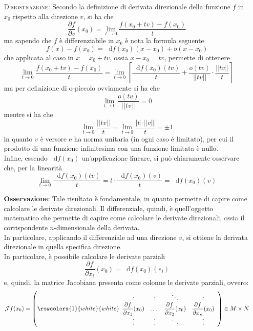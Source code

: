 \documentclass[a4paper]{extarticle}
\newcommand*\dif{\mathop{}\!\mathrm{d}}
\begin{document}
\vspace{2em}
\noindent
\normalfont \normalsize
\textsc{Dimostrazione}: Secondo la definizione di derivata direzionale della funzione $f$ in $x_0$ rispetto alla direzione $v$, si ha che
\[\frac{\partial f}{\partial v}(x_0)= \lim_{t \to 0} \frac{f(x_0+tv) - f(x_0)}{t}\]
ma sapendo che $f$ è differenziabile in $x_0$ è nota la formula seguente
\[f(x)-f(x_0) = \dif f(x_0)(x-x_0)+o(x-x_0)\]
che applicata al caso in $x=x_0+tv$, ossia $x-x_0=tv$, permette di ottenere
\[\lim_{t \to 0} \frac{f(x_0+tv) - f(x_0)}{t} = \lim_{t \to 0} \left[ \frac{\dif f(x_0) (tv)}{t} + \frac{o(t v)}{\vert \vert tv \vert \vert} \cdot \frac{\vert \vert tv \vert \vert}{t}\right]\]
ma per definizione di o-piccolo ovviamente si ha che
\[\lim_{t \to 0} \frac{o(t v)}{\vert \vert tv \vert \vert} = 0\]
mentre si ha che
\[\lim_{t \to 0} \frac{\vert \vert tv \vert \vert}{t} = \lim_{t \to 0} \frac{\vert t \vert \cdot \vert \vert v \vert \vert}{t} = \pm 1\]
in quanto $v$ è versore e ha norma unitaria (in ogni caso è limitato), per cui il prodotto di una funzione infinitesima con una funzione limitata è nullo.\\
Infine, essendo $\dif f(x_0)$ un'applicazione lineare, si può chiaramente osservare che, per la linearità
\[\lim_{t \to 0} \frac{\dif f(x_0) (tv)}{t} = t \cdot \frac{\dif f(x_0)(v)}{t} = \dif f(x_0) (v)\]

\vspace{1em}
\noindent
\textbf{Osservazione}: Tale risultato è fondamentale, in quanto permette di capire come calcolare le derivate direzionali. Il differenziale, quindi, è quell'oggetto matematico che permette di capire come calcolare le derivate direzionali, ossia il corrispondente $n$-dimensionale della derivata.\\
In particolare, applicando il differenziale ad una direzione $v$, si ottiene la derivata direzionale in quella specifica direzione.\\
In particolare, è possibile calcolare le derivate parziali
\[\frac{\partial f}{\partial x_i}(x_0) = \dif f(x_0) (e_i)\]
e, quindi, la matrice Jacobiana presenta come colonne le derivate parziali, ovvero:
\[\mathcal{J} f(x_0) =
    \left(
        \rowcolors{1}{white}{white}
        \begin{array}{cccc}
            \vdots & \vdots & \ddots & \vdots\\
            \dfrac{\partial f}{\partial x_1}(x_0) & \dots  & \dfrac{\partial f}{\partial x_2}(x_0) & \dfrac{\partial f}{\partial x_n}(x_0)\\
            \vdots & \vdots & \ddots & \vdots\\
        \end{array}
    \right) \in M \times N
\]
\end{document}
